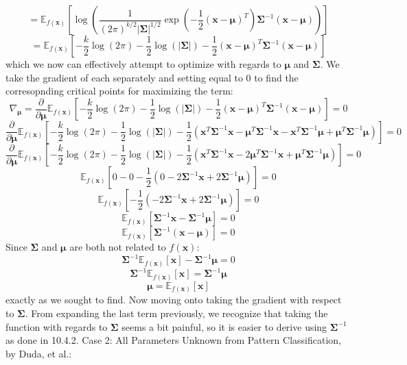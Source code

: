 \documentclass{article}
\begin{document}
{\[
  = \mathbb{E}_{f(\mathbf{x})} [\log( \frac{1}{(2\pi)^{k / 2} |\boldsymbol{\Sigma}|^{1 / 2}} \exp(-\frac{1}{2} (\mathbf{x} - \boldsymbol{\mu})^T) \boldsymbol{\Sigma}^{-1} (\mathbf{x} - \boldsymbol{\mu}))]
\]
\[
  = \mathbb{E}_{f(\mathbf{x})} [-\frac{k}{2} \log(2\pi) - \frac{1}{2} \log(|\boldsymbol{\Sigma}|) - \frac{1}{2}(\mathbf{x} - \boldsymbol{\mu})^T \boldsymbol{\Sigma}^{-1} (\mathbf{x} - \boldsymbol{\mu})]
\]
which we now can effectively attempt to optimize with regards to \(\boldsymbol{\mu}\) and \(\boldsymbol{\Sigma}\). We take the gradient of each separately and setting equal to 0 to find the corresopnding critical points for maximizing the term:
\[
  \nabla_{\boldsymbol{\mu}} = \frac{\partial}{\partial \boldsymbol{\mu}} \mathbb{E}_{f(\mathbf{x})} [-\frac{k}{2} \log(2\pi) - \frac{1}{2} \log(|\boldsymbol{\Sigma}|) - \frac{1}{2}(\mathbf{x} - \boldsymbol{\mu})^T \boldsymbol{\Sigma}^{-1} (\mathbf{x} - \boldsymbol{\mu})] = 0
\]
\[
  \frac{\partial}{\partial \boldsymbol{\mu}} \mathbb{E}_{f(\mathbf{x})} [-\frac{k}{2} \log(2\pi) - \frac{1}{2} \log(|\boldsymbol{\Sigma}|) - \frac{1}{2}(\mathbf{x}^T \boldsymbol{\Sigma}^{-1} \mathbf{x} - \boldsymbol{\mu}^T \boldsymbol{\Sigma}^{-1} \mathbf{x} - \mathbf{x}^T \boldsymbol{\Sigma}^{-1} \boldsymbol{\mu} + \boldsymbol{\mu}^T \boldsymbol{\Sigma}^{-1} \boldsymbol{\mu})] = 0
\]
\[
  \frac{\partial}{\partial \boldsymbol{\mu}} \mathbb{E}_{f(\mathbf{x})} [-\frac{k}{2} \log(2\pi) - \frac{1}{2} \log(|\boldsymbol{\Sigma}|) - \frac{1}{2}(\mathbf{x}^T \boldsymbol{\Sigma}^{-1} \mathbf{x} - 2 \boldsymbol{\mu}^T \boldsymbol{\Sigma}^{-1} \mathbf{x} + \boldsymbol{\mu}^T \boldsymbol{\Sigma}^{-1} \boldsymbol{\mu})] = 0
\]
\[
  \mathbb{E}_{f(\mathbf{x})} [0 - 0 - \frac{1}{2}(0 - 2 \boldsymbol{\Sigma}^{-1} \mathbf{x} + 2 \boldsymbol{\Sigma}^{-1} \boldsymbol{\mu})] = 0
\]
\[
  \mathbb{E}_{f(\mathbf{x})} [-\frac{1}{2}(- 2 \boldsymbol{\Sigma}^{-1} \mathbf{x} + 2 \boldsymbol{\Sigma}^{-1} \boldsymbol{\mu})] = 0
\]
\[
  \mathbb{E}_{f(\mathbf{x})} [\boldsymbol{\Sigma}^{-1} \mathbf{x} - \boldsymbol{\Sigma}^{-1} \boldsymbol{\mu}] = 0
\]
\[
  \mathbb{E}_{f(\mathbf{x})} [\boldsymbol{\Sigma}^{-1} (\mathbf{x} - \boldsymbol{\mu})] = 0
\]
Since \(\boldsymbol{\Sigma}\) and \(\boldsymbol{\mu}\) are both not related to \(f(\mathbf{x})\):
\[
  \boldsymbol{\Sigma}^{-1} \mathbb{E}_{f(\mathbf{x})} [\mathbf{x}] - \boldsymbol{\Sigma}^{-1} \boldsymbol{\mu} = 0
\]
\[
  \boldsymbol{\Sigma}^{-1} \mathbb{E}_{f(\mathbf{x})} [\mathbf{x}] = \boldsymbol{\Sigma}^{-1} \boldsymbol{\mu}
\]
\[
  \boxed{\boldsymbol{\mu} = \mathbb{E}_{f(\mathbf{x})} [\mathbf{x}]}
\]
exactly as we sought to find. Now moving onto taking the gradient with respect to \(\boldsymbol{\Sigma}\). From expanding the last term previously, we recognize that taking the function with regards to \(\boldsymbol{\Sigma}\) seems a bit painful, so it is easier to derive using \(\boldsymbol{\Sigma}^{-1}\) as done in 10.4.2. Case 2: All Parameters Unknown from Pattern Classification, by Duda, et al.:
}
\end{document}
